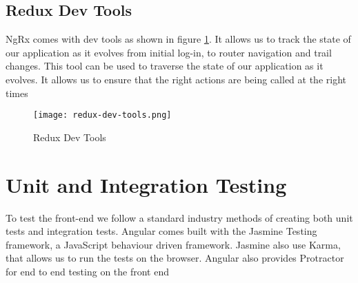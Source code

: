 \subsection{Redux Dev Tools}
NgRx comes with dev tools as shown in figure \ref{fig:reduxDevTools}. It allows us to track the state of our application as it evolves from initial log-in, to router navigation and trail changes. This tool can be used to traverse the state of our application as it evolves. It allows us to ensure that the right actions are being called at the right times
\begin{figure}[ht]
    \centering
    \texttt{[image: redux-dev-tools.png]}
    \caption{Redux Dev Tools}
    \label{fig:reduxDevTools}
\end{figure}


\section{Unit and Integration Testing}
To test the front-end we follow a standard industry methods of creating both unit tests and integration tests. Angular comes built with the Jasmine Testing framework, a JavaScript behaviour driven framework. Jasmine also use Karma, that allows us to run the tests on the browser. Angular also provides Protractor for end to end testing on the front end